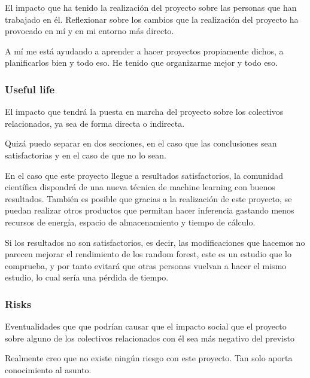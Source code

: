 \documentclass[a4paper]{article}
\begin{document}
            El impacto que ha tenido la realización del proyecto sobre las personas que han trabajado en él. Reflexionar sobre los cambios que la realización del proyecto ha provocado en mí y en mi entorno más directo.

            A mí me está ayudando a aprender a hacer proyectos propiamente dichos, a planificarlos bien y todo eso. He tenido que organizarme mejor y todo eso.

            \subsubsection{Useful life}

            El impacto que tendrá la puesta en marcha del proyecto sobre los colectivos relacionados, ya sea de forma directa o indirecta.

            Quizá puedo separar en dos secciones, en el caso que las conclusiones sean satisfactorias y en el caso de que no lo sean.

            En el caso que este proyecto llegue a resultados satisfactorios, la comunidad científica dispondrá de una nueva técnica de machine learning con buenos resultados. También es posible que gracias a la realización de este proyecto, se puedan realizar otros productos que permitan hacer inferencia gastando menos recursos de energía, espacio de almacenamiento y tiempo de cálculo.

            Si los resultados no son satisfactorios, es decir, las modificaciones que hacemos no parecen mejorar el rendimiento de los random forest, este es un estudio que lo comprueba, y por tanto evitará que otras personas vuelvan a hacer el mismo estudio, lo cual sería una pérdida de tiempo.

            \subsubsection{Risks}

            Eventualidades que que podrían causar que el impacto social que el proyecto sobre alguno de los colectivos relacionados con él sea más negativo del previsto


            Realmente creo que no existe ningún riesgo con este proyecto. Tan solo aporta conocimiento al asunto.












\printbibliography
\end{document}
